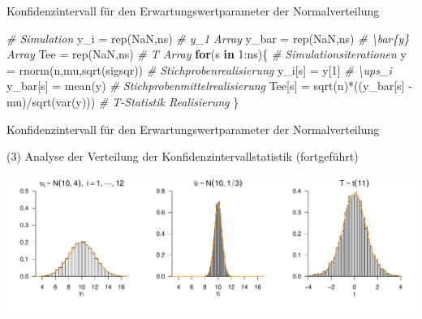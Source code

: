 \documentclass[
  8pt,
  ignorenonframetext,
]{beamer}
\newenvironment{Shaded}{\begin{snugshade}}{\end{snugshade}}
\newcommand{\CommentTok}[1]{\textcolor[rgb]{0.56,0.35,0.01}{\textit{#1}}}
\newcommand{\ConstantTok}[1]{\textcolor[rgb]{0.00,0.00,0.00}{#1}}
\newcommand{\ControlFlowTok}[1]{\textcolor[rgb]{0.13,0.29,0.53}{\textbf{#1}}}
\newcommand{\DecValTok}[1]{\textcolor[rgb]{0.00,0.00,0.81}{#1}}
\newcommand{\FunctionTok}[1]{\textcolor[rgb]{0.00,0.00,0.00}{#1}}
\newcommand{\NormalTok}[1]{#1}
\newcommand{\OtherTok}[1]{\textcolor[rgb]{0.56,0.35,0.01}{#1}}
\newcommand{\SpecialCharTok}[1]{\textcolor[rgb]{0.00,0.00,0.00}{#1}}
\begin{document}
\begin{frame}[fragile]{Konfidenzintervall für den
Erwartungswertparameter der Normalverteilung}
\begin{Shaded}
\begin{Highlighting}[]
\CommentTok{\# Simulation}
\NormalTok{y\_i     }\OtherTok{=} \FunctionTok{rep}\NormalTok{(}\ConstantTok{NaN}\NormalTok{,ns)                                 }\CommentTok{\# y\_1 Array}
\NormalTok{y\_bar   }\OtherTok{=} \FunctionTok{rep}\NormalTok{(}\ConstantTok{NaN}\NormalTok{,ns)                                 }\CommentTok{\# \textbackslash{}bar\{y\} Array}
\NormalTok{Tee     }\OtherTok{=} \FunctionTok{rep}\NormalTok{(}\ConstantTok{NaN}\NormalTok{,ns)                                 }\CommentTok{\# T Array}
\ControlFlowTok{for}\NormalTok{(s }\ControlFlowTok{in} \DecValTok{1}\SpecialCharTok{:}\NormalTok{ns)\{                                       }\CommentTok{\# Simulationsiterationen}
\NormalTok{  y         }\OtherTok{=} \FunctionTok{rnorm}\NormalTok{(n,mu,}\FunctionTok{sqrt}\NormalTok{(sigsqr))                }\CommentTok{\# Stichprobenrealisierung}
\NormalTok{  y\_i[s]    }\OtherTok{=}\NormalTok{ y[}\DecValTok{1}\NormalTok{]                                    }\CommentTok{\# \textbackslash{}ups\_i}
\NormalTok{  y\_bar[s]  }\OtherTok{=} \FunctionTok{mean}\NormalTok{(y)                                 }\CommentTok{\# Stichprobenmittelrealisierung}
\NormalTok{  Tee[s]    }\OtherTok{=} \FunctionTok{sqrt}\NormalTok{(n)}\SpecialCharTok{*}\NormalTok{((y\_bar[s] }\SpecialCharTok{{-}}\NormalTok{ mu)}\SpecialCharTok{/}\FunctionTok{sqrt}\NormalTok{(}\FunctionTok{var}\NormalTok{(y)))  }\CommentTok{\# T{-}Statistik Realisierung}
\NormalTok{\}}
\end{Highlighting}
\end{Shaded}
\end{frame}

\begin{frame}{Konfidenzintervall für den Erwartungswertparameter der
Normalverteilung}
\protect\hypertarget{konfidenzintervall-fuxfcr-den-erwartungswertparameter-der-normalverteilung-2}{}
\normalsize

\noindent (3) Analyse der Verteilung der Konfidenzintervallstatistik
(fortgeführt)

\vfill

\begin{center}\includegraphics[width=1\linewidth]{11_Abbildungen/wtfi_11_t_statistik} \end{center}
\vfill
\end{frame}
\end{document}
